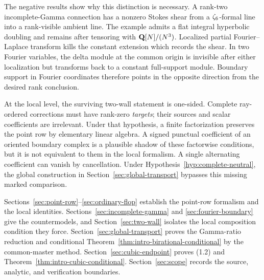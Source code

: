 The negative results show why this distinction is necessary.  A rank-two
incomplete-Gamma connection has a nonzero Stokes shear from a
\(\zeta_{6}\)-formal line into a rank-visible ambient line.  The example admits
a flat integral hyperbolic doubling and remains after tensoring with
\(\mathbf Q[N]/(N^3)\).  Localized partial Fourier--Laplace transform kills
the constant extension which records the shear.  In two Fourier variables,
the delta module at the common origin is invisible after either localization
but transforms back to a constant full-support module.  Boundary support in
Fourier coordinates therefore points in the opposite direction from the
desired rank conclusion.

At the local level, the surviving two-wall statement is one-sided.  Complete ray-ordered
corrections must have rank-zero \emph{targets}; their sources and scalar
coefficients are irrelevant.  Under that hypothesis, a finite factorization
preserves the point row by elementary linear algebra.  A signed punctual
coefficient of an oriented boundary complex is a plausible shadow of these
factorwise conditions, but it is not equivalent to them in the local
formalism.  A single alternating coefficient can vanish by cancellation.
Under Hypothesis~\ref{hyp:complete-neutral}, the global construction in
Section~\ref{sec:global-transport} bypasses this missing marked comparison.

Sections~\ref{sec:point-row}--\ref{sec:ordinary-flop} establish the point-row
formalism and the local identities.  Sections~\ref{sec:incomplete-gamma} and
\ref{sec:fourier-boundary} give the countermodels, and
Section~\ref{sec:two-wall} isolates the local composition condition they
force.  Section~\ref{sec:global-transport} proves the Gamma-ratio reduction
and conditional Theorem~\ref{thm:intro-birational-conditional} by the
common-master method.  Section~\ref{sec:cubic-endpoint} proves (1.2) and
Theorem~\ref{thm:intro-cubic-conditional}.  Section~\ref{sec:scope} records the source,
analytic, and verification boundaries.
